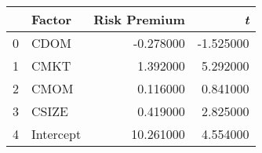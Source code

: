 \begin{tabular}{llrr}
\toprule
 & Factor & Risk Premium & \emph{t} \\
\midrule
0 & CDOM & -0.278000 & -1.525000 \\
1 & CMKT & 1.392000 & 5.292000 \\
2 & CMOM & 0.116000 & 0.841000 \\
3 & CSIZE & 0.419000 & 2.825000 \\
4 & Intercept & 10.261000 & 4.554000 \\
\bottomrule
\end{tabular}
